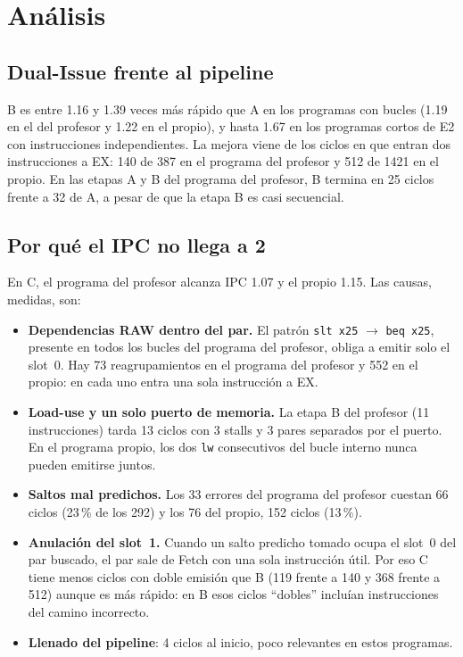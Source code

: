 \documentclass[12pt,a4paper]{article}
\begin{document}
\section{Análisis}
\label{sec:analisis}

\subsection{Dual-Issue frente al pipeline}

B es entre 1.16 y 1.39 veces más rápido que A en los programas con bucles (1.19 en el del profesor y 1.22 en el propio), y hasta 1.67 en los programas cortos de E2 con instrucciones independientes. La mejora viene de los ciclos en que entran dos instrucciones a EX: 140 de 387 en el programa del profesor y 512 de 1421 en el propio. En las etapas A y B del programa del profesor, B termina en 25 ciclos frente a 32 de A, a pesar de que la etapa B es casi secuencial.

\subsection{Por qué el IPC no llega a 2}

En C, el programa del profesor alcanza IPC 1.07 y el propio 1.15. Las causas, medidas, son:
\begin{itemize}
    \item \textbf{Dependencias RAW dentro del par.} El patrón \texttt{slt x25} $\to$ \texttt{beq x25}, presente en todos los bucles del programa del profesor, obliga a emitir solo el slot~0. Hay 73 reagrupamientos en el programa del profesor y 552 en el propio: en cada uno entra una sola instrucción a EX.
    \item \textbf{Load-use y un solo puerto de memoria.} La etapa B del profesor (11 instrucciones) tarda 13 ciclos con 3 stalls y 3 pares separados por el puerto. En el programa propio, los dos \texttt{lw} consecutivos del bucle interno nunca pueden emitirse juntos.
    \item \textbf{Saltos mal predichos.} Los 33 errores del programa del profesor cuestan 66 ciclos (23\,\% de los 292) y los 76 del propio, 152 ciclos (13\,\%).
    \item \textbf{Anulación del slot~1.} Cuando un salto predicho tomado ocupa el slot~0 del par buscado, el par sale de Fetch con una sola instrucción útil. Por eso C tiene menos ciclos con doble emisión que B (119 frente a 140 y 368 frente a 512) aunque es más rápido: en B esos ciclos ``dobles'' incluían instrucciones del camino incorrecto.
    \item \textbf{Llenado del pipeline}: 4 ciclos al inicio, poco relevantes en estos programas.
\end{itemize}
\end{document}
